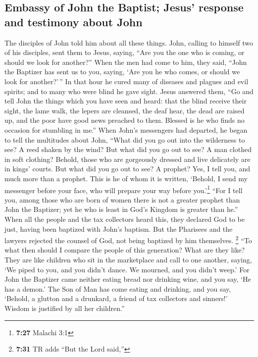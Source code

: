 \hypertarget{embassy-of-john-the-baptist-jesus-response-and-testimony-about-john}{%
\subsection{Embassy of John the Baptist; Jesus' response and testimony
about
John}\label{embassy-of-john-the-baptist-jesus-response-and-testimony-about-john}}

 The disciples of John told him about all these things.
 John, calling to himself two of his disciples, sent them
to Jesus, saying, ``Are you the one who is coming, or should we look for
another?''  When the men had come to him, they said,
``John the Baptizer has sent us to you, saying, `Are you he who comes,
or should we look for another?'\,''  In that hour he
cured many of diseases and plagues and evil spirits; and to many who
were blind he gave sight.  Jesus answered them, ``Go and
tell John the things which you have seen and heard: that the blind
receive their sight, the lame walk, the lepers are cleansed, the deaf
hear, the dead are raised up, and the poor have good news preached to
them.  Blessed is he who finds no occasion for stumbling
in me.''  When John's messengers had departed, he began
to tell the multitudes about John, ``What did you go out into the
wilderness to see? A reed shaken by the wind?  But what
did you go out to see? A man clothed in soft clothing? Behold, those who
are gorgeously dressed and live delicately are in kings' courts.
 But what did you go out to see? A prophet? Yes, I tell
you, and much more than a prophet.  This is he of whom it
is written, `Behold, I send my messenger before your face, who will
prepare your way before you.'\footnote{\textbf{7:27} Malachi 3:1}
 ``For I tell you, among those who are born of women
there is not a greater prophet than John the Baptizer; yet he who is
least in God's Kingdom is greater than he.''  When all
the people and the tax collectors heard this, they declared God to be
just, having been baptized with John's baptism.  But the
Pharisees and the lawyers rejected the counsel of God, not being
baptized by him themselves.  \footnote{\textbf{7:31} TR
  adds ``But the Lord said,''} ``To what then should I compare the
people of this generation? What are they like?  They are
like children who sit in the marketplace and call to one another,
saying, `We piped to you, and you didn't dance. We mourned, and you
didn't weep.'  For John the Baptizer came neither eating
bread nor drinking wine, and you say, `He has a demon.' 
The Son of Man has come eating and drinking, and you say, `Behold, a
glutton and a drunkard, a friend of tax collectors and sinners!'
 Wisdom is justified by all her children.''

